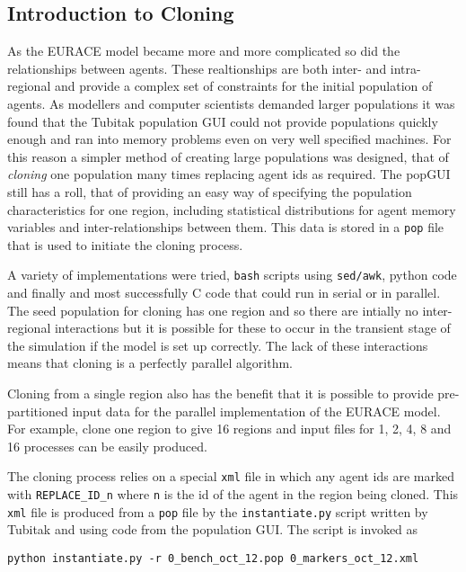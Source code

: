 \subsection{Introduction to Cloning}
\label{sec:cloning}

As the EURACE model became more and more complicated so did the relationships between agents. These realtionships are both inter- and intra- regional and provide a complex set of constraints for the initial population of agents. As modellers and computer scientists demanded larger populations it was found that the Tubitak population GUI could not provide populations quickly enough and ran into memory problems even on very well specified machines. For this reason a simpler method of creating large populations was designed, that of \textit{cloning} one population many times replacing agent ids as required. The popGUI still has a roll, that of providing an easy way of specifying the population characteristics for one region, including statistical distributions for agent memory variables and inter-relationships between them. This data is stored in a \texttt{pop} file that is used to initiate the cloning process.

A variety of implementations were tried, \texttt{bash} scripts using \texttt{sed/awk}, python code and finally and most successfully C code that could run in serial or in parallel. The seed population for cloning has one region and so there are intially no inter-regional interactions but it is possible for these to occur in the transient stage of the simulation if the model is set up correctly. The lack of these interactions means that cloning is a perfectly parallel algorithm.

Cloning from a single region also has the benefit that it is possible to provide pre-partitioned input data for the parallel implementation of the EURACE model. For example, clone one region to give 16 regions and input files for 1, 2, 4, 8 and 16 processes can be easily produced.

The cloning process relies on a special \texttt{xml} file in which any agent ids are marked with \texttt{REPLACE\_ID\_n} where \texttt{n} is the id of the agent in the region being cloned. This \texttt{xml} file is produced from a \texttt{pop} file by the \texttt{instantiate.py} script written by Tubitak and using code from the population GUI. The script is invoked as

\begin{verbatim}
python instantiate.py -r 0_bench_oct_12.pop 0_markers_oct_12.xml
\end{verbatim}

